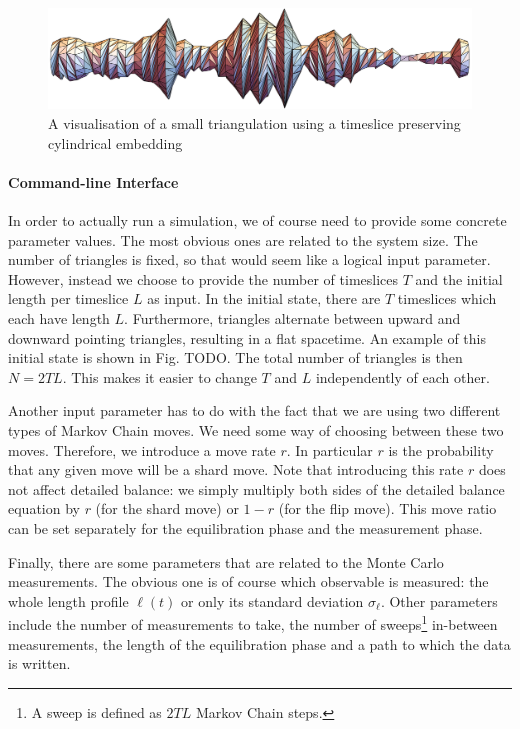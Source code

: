 \begin{figure}[h]
    \centering
    \includegraphics[width=0.98\linewidth]{img/triangulation_visualisation.pdf}
    \caption{A visualisation of a small triangulation using a timeslice preserving cylindrical embedding}
    \label{fig:triangulation_visualisation}
\end{figure}

\paragraph{Command-line Interface}
In order to actually run a simulation, we of course need to provide some concrete parameter values. The most obvious ones are related to the system size. The number of triangles is fixed, so that would seem like a logical input parameter. However, instead we choose to provide the number of timeslices $T$ and the initial length per timeslice $L$ as input. In the initial state, there are $T$ timeslices which each have length $L$. Furthermore, triangles alternate between upward and downward pointing triangles, resulting in a flat spacetime. An example of this initial state is shown in Fig. TODO. The total number of triangles is then $N = 2 T L$. This makes it easier to change $T$ and $L$ independently of each other.

Another input parameter has to do with the fact that we are using two different types of Markov Chain moves. We need some way of choosing between these two moves. Therefore, we introduce a move rate $r$. In particular $r$ is the probability that any given move will be a shard move. Note that introducing this rate $r$ does not affect detailed balance: we simply multiply both sides of the detailed balance equation by $r$ (for the shard move) or $1 - r$ (for the flip move). This move ratio can be set separately for the equilibration phase and the measurement phase.

Finally, there are some parameters that are related to the Monte Carlo measurements. The obvious one is of course which observable is measured: the whole length profile $\ell(t)$ or only its standard deviation $\sigma_\ell$. Other parameters include the number of measurements to take, the number of sweeps\footnote{A sweep is defined as $2 T L$ Markov Chain steps.} in-between measurements, the length of the equilibration phase and a path to which the data is written.



